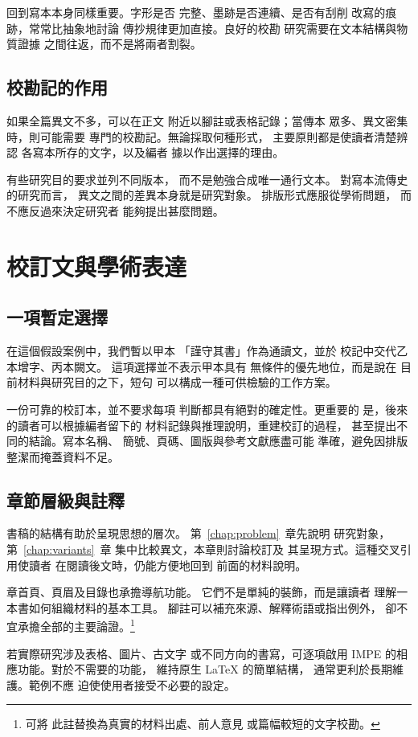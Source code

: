 \documentclass[lang=zh]{impebook}
\begin{document}
回到寫本本身同樣重要。字形是否
完整、墨跡是否連續、是否有刮削
改寫的痕跡，常常比抽象地討論
傳抄規律更加直接。良好的校勘
研究需要在文本結構與物質證據
之間往返，而不是將兩者割裂。

\section{校勘記的作用}
如果全篇異文不多，可以在正文
附近以腳註或表格記錄；當傳本
眾多、異文密集時，則可能需要
專門的校勘記。無論採取何種形式，
主要原則都是使讀者清楚辨認
各寫本所存的文字，以及編者
據以作出選擇的理由。

有些研究目的要求並列不同版本，
而不是勉強合成唯一通行文本。
對寫本流傳史的研究而言，
異文之間的差異本身就是研究對象。
排版形式應服從學術問題，
而不應反過來決定研究者
能夠提出甚麼問題。

\chapter{校訂文與學術表達}\label{chap:edition}
\section{一項暫定選擇}
在這個假設案例中，我們暫以甲本
「謹守其書」作為通讀文，並於
校記中交代乙本增字、丙本闕文。
這項選擇並不表示甲本具有
無條件的優先地位，而是說在
目前材料與研究目的之下，短句
可以構成一種可供檢驗的工作方案。

一份可靠的校訂本，並不要求每項
判斷都具有絕對的確定性。更重要的
是，後來的讀者可以根據編者留下的
材料記錄與推理說明，重建校訂的過程，
甚至提出不同的結論。寫本名稱、
簡號、頁碼、圖版與參考文獻應盡可能
準確，避免因排版整潔而掩蓋資料不足。

\section{章節層級與註釋}
書稿的結構有助於呈現思想的層次。
第~\ref{chap:problem}~章先說明
研究對象，第~\ref{chap:variants}~章
集中比較異文，本章則討論校訂及
其呈現方式。這種交叉引用使讀者
在閱讀後文時，仍能方便地回到
前面的材料說明。

章首頁、頁眉及目錄也承擔導航功能。
它們不是單純的裝飾，而是讓讀者
理解一本書如何組織材料的基本工具。
腳註可以補充來源、解釋術語或指出例外，
卻不宜承擔全部的主要論證。\footnote{可將
此註替換為真實的材料出處、前人意見
或篇幅較短的文字校勘。}

若實際研究涉及表格、圖片、古文字
或不同方向的書寫，可逐項啟用 IMPE
的相應功能。對於不需要的功能，
維持原生 \LaTeX{} 的簡單結構，
通常更利於長期維護。範例不應
迫使使用者接受不必要的設定。
\end{document}
